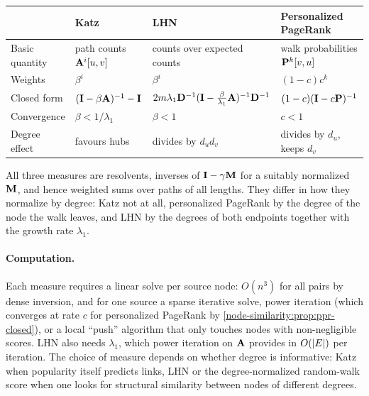 \begin{notechapter}
\begin{center}
\small
\begin{tabular}{@{}llll@{}}
\toprule
 & \textbf{Katz} & \textbf{LHN} & \textbf{Personalized PageRank} \\
\midrule
Basic quantity & path counts $\mathbf{A}^i[u,v]$ & counts over expected counts & walk probabilities $\mathbf{P}^k[v,u]$ \\
Weights & $\beta^i$ & $\beta^i$ & $(1-c)c^k$ \\
Closed form & $(\mathbf{I} - \beta\mathbf{A})^{-1} - \mathbf{I}$ & $2m\lambda_1\mathbf{D}^{-1}(\mathbf{I} - \tfrac{\beta}{\lambda_1}\mathbf{A})^{-1}\mathbf{D}^{-1}$ & $(1-c)(\mathbf{I} - c\mathbf{P})^{-1}$ \\
Convergence & $\beta < 1/\lambda_1$ & $\beta < 1$ & $c < 1$ \\
Degree effect & favours hubs & divides by $d_ud_v$ & divides by $d_u$, keeps $d_v$ \\
\bottomrule
\end{tabular}
\end{center}

\begin{keyidea}
All three measures are resolvents, inverses of $\mathbf{I} - \gamma\mathbf{M}$ for a suitably normalized $\mathbf{M}$, and hence weighted sums over paths of all lengths. They differ in how they normalize by degree: Katz not at all, personalized PageRank by the degree of the node the walk leaves, and LHN by the degrees of both endpoints together with the growth rate $\lambda_1$.
\end{keyidea}

\paragraph{Computation.} Each measure requires a linear solve per source node: $O(n^3)$ for all pairs by dense inversion, and for one source a sparse iterative solve, power iteration (which converges at rate $c$ for personalized PageRank by \cref{node-similarity:prop:ppr-closed}), or a local ``push'' algorithm that only touches nodes with non-negligible scores. LHN also needs $\lambda_1$, which power iteration on $\mathbf{A}$ provides in $O(\left|E\right|)$ per iteration. The choice of measure depends on whether degree is informative: Katz when popularity itself predicts links, LHN or the degree-normalized random-walk score when one looks for structural similarity between nodes of different degrees.


\end{notechapter}
